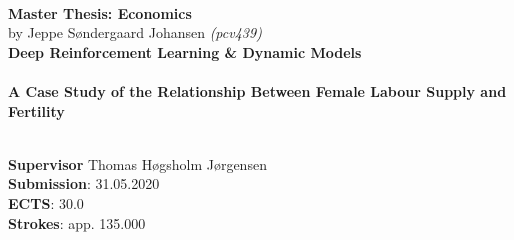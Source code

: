 \documentclass[12pt,oneside]{article}
\begin{document}

    \thispagestyle{empty}
    \vspace*{3.75cm}
    \textbf{\large\\ Master Thesis: Economics}\\
    \vspace*{0.1cm}
    by Jeppe Søndergaard Johansen \textit{(pcv439)} \hspace{1.0cm}
    \vspace*{2.75cm}\\
    \textbf{\LARGE Deep Reinforcement Learning \& Dynamic Models} \\
    \vspace*{0.1cm} \\
    \textbf{A Case Study of the Relationship Between Female Labour Supply and Fertility }
    \begin{tabbing}
    \\[7.55cm]
    \textbf{Supervisor} Thomas Høgsholm Jørgensen \\
    \textbf{Submission}: 31.05.2020\\
    \textbf{ECTS}: 30.0\\
    \textbf{Strokes}: app. 135.000\\
    \end{tabbing}
    \newpage
    \ClearWallPaper
\end{document}
